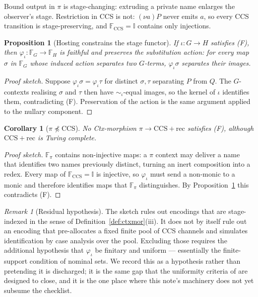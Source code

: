 \documentclass[11pt,a4paper]{article}
\theoremstyle{definition}
\theoremstyle{plain}
\newtheorem{proposition}[definition]{Proposition}
\newtheorem{corollary}[definition]{Corollary}
\theoremstyle{remark}
\newtheorem{remark}[definition]{Remark}
\begin{document}
Bound output in $\pi$ is stage-changing: extruding a private name enlarges the
observer's stage. Restriction in CCS is not: $(\nu a)P$ never emits $a$, so every
CCS transition is stage-preserving, and $\mathbb{F}_{\mathrm{CCS}} = \mathbb{I}$
contains only injections.

\begin{proposition}[Hosting constrains the stage functor]
\label{prop:stagefunctor}
If $\iota : G \to H$ satisfies (F), then $\varphi_\iota : \mathbb{F}_G \to
\mathbb{F}_H$ is faithful and preserves the substitution action: for every map
$\sigma$ in $\mathbb{F}_G$ whose induced action separates two $G$-terms,
$\varphi_\iota \sigma$ separates their images.
\end{proposition}

\begin{proof}[Proof sketch]
Suppose $\varphi_\iota \sigma = \varphi_\iota \tau$ for distinct $\sigma, \tau$
separating $P$ from $Q$. The $G$-contexts realising $\sigma$ and $\tau$ then have
$\sim_\iota$-equal images, so the kernel of $\iota$ identifies them, contradicting
(F). Preservation of the action is the same argument applied to the nullary
component.
\end{proof}

\begin{corollary}[$\pi \not\preceq \mathrm{CCS}$]
\label{cor:pinotccs}
No Ctx-morphism $\pi \to \mathrm{CCS}{+}\mathrm{rec}$ satisfies (F), although
$\mathrm{CCS}{+}\mathrm{rec}$ is Turing complete.
\end{corollary}

\begin{proof}[Proof sketch]
$\mathbb{F}_\pi$ contains non-injective maps: a $\pi$ context may deliver a name
that identifies two names previously distinct, turning an inert composition into a
redex. Every map of $\mathbb{F}_{\mathrm{CCS}} = \mathbb{I}$ is injective, so
$\varphi_\iota$ must send a non-monic to a monic and therefore identifies maps that
$\mathbb{F}_\pi$ distinguishes. By Proposition~\ref{prop:stagefunctor} this
contradicts (F).
\end{proof}

\begin{remark}[Residual hypothesis]
\label{rem:residual}
The sketch rules out encodings that are stage-indexed in the sense of
Definition~\ref{def:ctxmor}(iii). It does not by itself rule out an encoding that
pre-allocates a fixed finite pool of CCS channels and simulates identification by
case analysis over the pool. Excluding those requires the additional hypothesis
that $\varphi_\iota$ be finitary and uniform --- essentially the finite-support
condition of nominal sets. We record this as a hypothesis rather than pretending it
is discharged; it is the same gap that the uniformity criteria of \cite{gorla} are
designed to close, and it is the one place where this note's machinery does not yet
subsume the checklist.
\end{remark}
\end{document}
